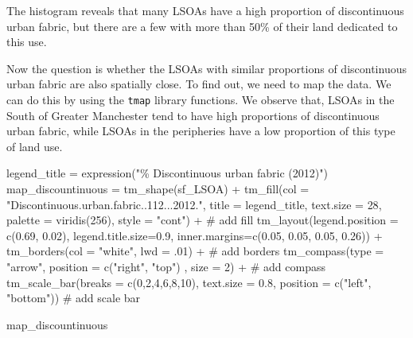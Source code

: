 \documentclass[
  letterpaper,
  DIV=11,
  numbers=noendperiod]{scrreprt}
\newenvironment{Shaded}{\begin{snugshade}}{\end{snugshade}}
\newcommand{\AttributeTok}[1]{\textcolor[rgb]{0.40,0.45,0.13}{#1}}
\newcommand{\CommentTok}[1]{\textcolor[rgb]{0.37,0.37,0.37}{#1}}
\newcommand{\DecValTok}[1]{\textcolor[rgb]{0.68,0.00,0.00}{#1}}
\newcommand{\FloatTok}[1]{\textcolor[rgb]{0.68,0.00,0.00}{#1}}
\newcommand{\FunctionTok}[1]{\textcolor[rgb]{0.28,0.35,0.67}{#1}}
\newcommand{\NormalTok}[1]{\textcolor[rgb]{0.00,0.23,0.31}{#1}}
\newcommand{\OtherTok}[1]{\textcolor[rgb]{0.00,0.23,0.31}{#1}}
\newcommand{\SpecialCharTok}[1]{\textcolor[rgb]{0.37,0.37,0.37}{#1}}
\newcommand{\StringTok}[1]{\textcolor[rgb]{0.13,0.47,0.30}{#1}}
\begin{document}
The histogram reveals that many LSOAs have a high proportion of
discontinuous urban fabric, but there are a few with more than 50\% of
their land dedicated to this use.

Now the question is whether the LSOAs with similar proportions of
discontinuous urban fabric are also spatially close. To find out, we
need to map the data. We can do this by using the \texttt{tmap} library
functions. We observe that, LSOAs in the South of Greater Manchester
tend to have high proportions of discontinuous urban fabric, while LSOAs
in the peripheries have a low proportion of this type of land use.

\begin{Shaded}
\begin{Highlighting}[]
\NormalTok{legend\_title }\OtherTok{=} \FunctionTok{expression}\NormalTok{(}\StringTok{"\% Discontinuous urban fabric (2012)"}\NormalTok{)}
\NormalTok{map\_discountinuous }\OtherTok{=} \FunctionTok{tm\_shape}\NormalTok{(sf\_LSOA) }\SpecialCharTok{+}
  \FunctionTok{tm\_fill}\NormalTok{(}\AttributeTok{col =} \StringTok{"Discontinuous.urban.fabric..112...2012."}\NormalTok{, }\AttributeTok{title =}\NormalTok{ legend\_title, }\AttributeTok{text.size =} \DecValTok{28}\NormalTok{, }\AttributeTok{palette =} \FunctionTok{viridis}\NormalTok{(}\DecValTok{256}\NormalTok{), }\AttributeTok{style =} \StringTok{"cont"}\NormalTok{) }\SpecialCharTok{+} \CommentTok{\# add fill}
  \FunctionTok{tm\_layout}\NormalTok{(}\AttributeTok{legend.position =} \FunctionTok{c}\NormalTok{(}\FloatTok{0.69}\NormalTok{, }\FloatTok{0.02}\NormalTok{), }\AttributeTok{legend.title.size=}\FloatTok{0.9}\NormalTok{, }\AttributeTok{inner.margins=}\FunctionTok{c}\NormalTok{(}\FloatTok{0.05}\NormalTok{, }\FloatTok{0.05}\NormalTok{, }\FloatTok{0.05}\NormalTok{, }\FloatTok{0.26}\NormalTok{)) }\SpecialCharTok{+}
  \FunctionTok{tm\_borders}\NormalTok{(}\AttributeTok{col =} \StringTok{"white"}\NormalTok{, }\AttributeTok{lwd =}\NormalTok{ .}\DecValTok{01}\NormalTok{)  }\SpecialCharTok{+} \CommentTok{\# add borders}
  \FunctionTok{tm\_compass}\NormalTok{(}\AttributeTok{type =} \StringTok{"arrow"}\NormalTok{, }\AttributeTok{position =} \FunctionTok{c}\NormalTok{(}\StringTok{"right"}\NormalTok{, }\StringTok{"top"}\NormalTok{) , }\AttributeTok{size =} \DecValTok{2}\NormalTok{) }\SpecialCharTok{+} \CommentTok{\# add compass}
  \FunctionTok{tm\_scale\_bar}\NormalTok{(}\AttributeTok{breaks =} \FunctionTok{c}\NormalTok{(}\DecValTok{0}\NormalTok{,}\DecValTok{2}\NormalTok{,}\DecValTok{4}\NormalTok{,}\DecValTok{6}\NormalTok{,}\DecValTok{8}\NormalTok{,}\DecValTok{10}\NormalTok{), }\AttributeTok{text.size =} \FloatTok{0.8}\NormalTok{, }\AttributeTok{position =}  \FunctionTok{c}\NormalTok{(}\StringTok{"left"}\NormalTok{, }\StringTok{"bottom"}\NormalTok{)) }\CommentTok{\# add scale bar}

\NormalTok{map\_discountinuous}
\end{Highlighting}
\end{Shaded}
\end{document}
